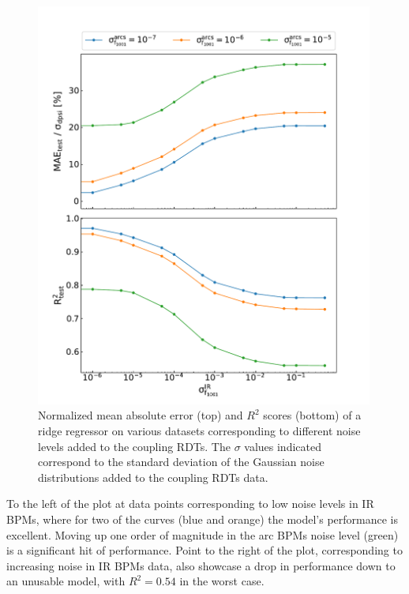 \begin{figure}[!htb]
    \centering
    \includegraphics*[width=0.99\textwidth]{Figures/ML_for_IR_Coupling/ml_ridge_performance.pdf}
    \caption{Normalized mean absolute error (top) and \(R^2\) scores (bottom) of a ridge regressor on various datasets corresponding to different noise levels added to the coupling RDTs. The \(\sigma\) values indicated correspond to the standard deviation of the Gaussian noise distributions added to the coupling RDTs data.}
    \label{figure:ridge_performance}
\end{figure}

To the left of the plot at data points corresponding to low noise levels in IR BPMs, where for two of the curves (\textcolor{mplblue}{blue} and \textcolor{mplorange}{orange}) the model's performance is excellent.
Moving up one order of magnitude in the arc BPMs noise level (\textcolor{mplgreen}{green}) is a significant hit of performance.
Point to the right of the plot, corresponding to increasing noise in IR BPMs data, also showcase a drop in performance down to an unusable model, with \(R^2 = 0.54\) in the worst case.


